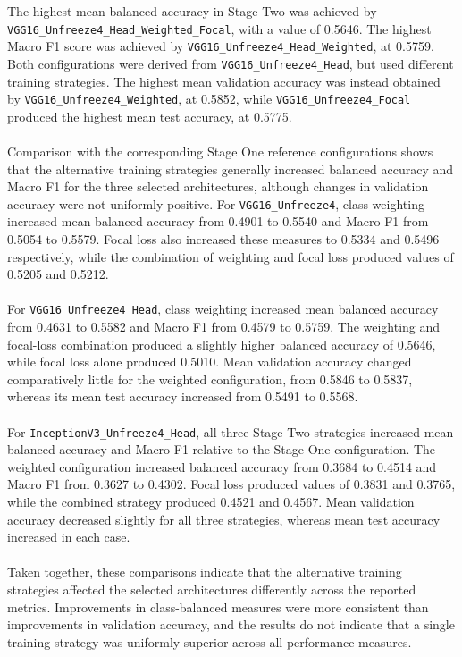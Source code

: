 \documentclass[12pt, a4paper]{report}
\begin{document}
				\noindent
				The highest mean balanced accuracy in Stage Two was achieved by \\\texttt{VGG16\_Unfreeze4\_Head\_Weighted\_Focal}, with a value of 0.5646. The highest Macro F1 score was achieved by \texttt{VGG16\_Unfreeze4\_Head\_Weighted}, at 0.5759. Both configurations were derived from \texttt{VGG16\_Unfreeze4\_Head}, but used different training strategies. The highest mean validation accuracy was instead obtained by \texttt{VGG16\_Unfreeze4\_Weighted}, at 0.5852, while \texttt{VGG16\_Unfreeze4\_Focal} produced the highest mean test accuracy, at 0.5775.\\\\
				Comparison with the corresponding Stage One reference configurations shows that the alternative training strategies generally increased balanced accuracy and Macro F1 for the three selected architectures, although changes in validation accuracy were not uniformly positive. For \texttt{VGG16\_Unfreeze4}, class weighting increased mean balanced accuracy from 0.4901 to 0.5540 and Macro F1 from 0.5054 to 0.5579. Focal loss also increased these measures to 0.5334 and 0.5496 respectively, while the combination of weighting and focal loss produced values of 0.5205 and 0.5212.\\\\
				For \texttt{VGG16\_Unfreeze4\_Head}, class weighting increased mean balanced accuracy from 0.4631 to 0.5582 and Macro F1 from 0.4579 to 0.5759. The weighting and focal-loss combination produced a slightly higher balanced accuracy of 0.5646, while focal loss alone produced 0.5010. Mean validation accuracy changed comparatively little for the weighted configuration, from 0.5846 to 0.5837, whereas its mean test accuracy increased from 0.5491 to 0.5568.\\\\
				For \texttt{InceptionV3\_Unfreeze4\_Head}, all three Stage Two strategies increased mean balanced accuracy and Macro F1 relative to the Stage One configuration. The weighted configuration increased balanced accuracy from 0.3684 to 0.4514 and Macro F1 from 0.3627 to 0.4302. Focal loss produced values of 0.3831 and 0.3765, while the combined strategy produced 0.4521 and 0.4567. Mean validation accuracy decreased slightly for all three strategies, whereas mean test accuracy increased in each case.\\\\
				Taken together, these comparisons indicate that the alternative training strategies affected the selected architectures differently across the reported metrics. Improvements in class-balanced measures were more consistent than improvements in validation accuracy, and the results do not indicate that a single training strategy was uniformly superior across all performance measures.
\end{document}
